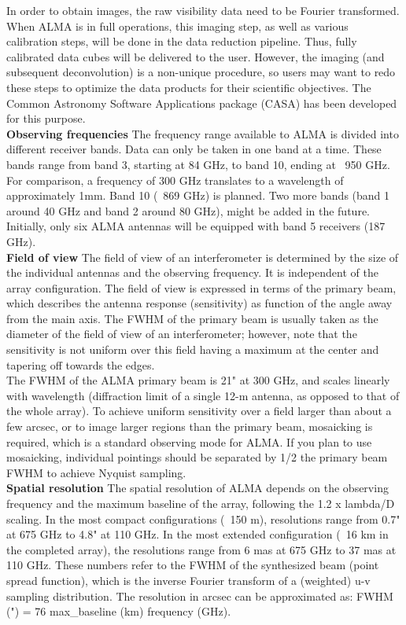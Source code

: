 In order to obtain images, the raw visibility data need to be Fourier transformed. When ALMA is in full operations, this imaging step, as well as various calibration steps, will be done in the data reduction pipeline. Thus, fully calibrated data cubes will be delivered to the user. However, the imaging (and subsequent deconvolution) is a non-unique procedure, so users may want to redo these steps to optimize the data products for their scientific objectives. The Common Astronomy Software Applications package (CASA) has been developed for this purpose.\\

\textbf{Observing frequencies}
The frequency range available to ALMA is divided into different receiver bands. Data can only be taken in one band at a time. These bands range from band 3, starting at 84 GHz, to band 10, ending at ~950 GHz. For comparison, a frequency of 300 GHz translates to a wavelength of approximately 1mm. Band 10 (~869 GHz) is planned. Two more bands (band 1 around 40 GHz and band 2 around 80 GHz), might be added in the future. Initially, only six ALMA antennas will be equipped with band 5 receivers (187 GHz).\\

\textbf{Field of view}
The field of view of an interferometer is determined by the size of the individual antennas and the observing frequency. It is independent of the array configuration. The field of view is expressed in terms of the primary beam, which describes the antenna response (sensitivity) as function of the angle away from the main axis. The FWHM of the primary beam is usually taken as the diameter of the field of view of an interferometer; however, note that the sensitivity is not uniform over this field having a maximum at the center and tapering off towards the edges.\\

The FWHM of the ALMA primary beam is 21" at 300 GHz, and scales linearly with wavelength (diffraction limit of a single 12-m antenna, as opposed to that of the whole array). To achieve uniform sensitivity over a field larger than about a few arcsec, or to image larger regions than the primary beam, mosaicking is required, which is a standard observing mode for ALMA. If you plan to use mosaicking, individual pointings should be separated by 1/2 the primary beam FWHM to achieve Nyquist sampling.\\

\textbf{Spatial resolution}
The spatial resolution of ALMA depends on the observing frequency and the maximum baseline of the array, following the 1.2 x lambda/D scaling. In the most compact configurations (~150 m), resolutions range from 0.7" at 675 GHz to 4.8" at 110 GHz. In the most extended configuration (~16 km in the completed array), the resolutions range from 6 mas at 675 GHz to 37 mas at 110 GHz. These numbers refer to the FWHM of the synthesized beam (point spread function), which is the inverse Fourier transform of a (weighted) u-v sampling distribution. The resolution in arcsec can be approximated as: FWHM (") = 76 \/ max\_baseline (km) \/ frequency (GHz).\\

